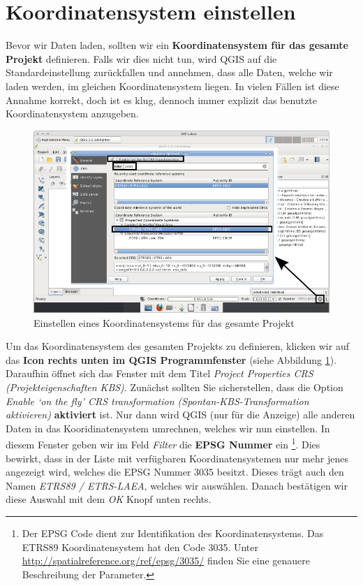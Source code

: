 \documentclass[a4paper,12pt,ngerman]{sphinxmanual}
\begin{document}
\section{Koordinatensystem einstellen}
\label{uebung2:koordinatensystem-einstellen}
Bevor wir Daten laden, sollten wir ein \textbf{Koordinatensystem für das gesamte Projekt} definieren. Falls wir dies nicht tun, wird QGIS auf die Standardeinstellung zurückfallen und annehmen, dass alle Daten, welche wir laden werden, im gleichen Koordinatensystem liegen. In vielen Fällen ist diese Annahme korrekt, doch ist es klug, dennoch immer explizit das benutzte Koordinatensystem anzugeben.
\begin{figure}[htbp]
\centering
\capstart

\includegraphics{qgis_srs.png}
\caption{Einstellen eines Koordinatensystems für das gesamte Projekt}\label{uebung2:figsrs}\end{figure}

Um das Koordinatensystem des gesamten Projekts zu definieren, klicken wir auf das \textbf{Icon rechts unten im QGIS Programmfenster} (siehe Abbildung \hyperref[uebung2:figsrs]{ \ref*{uebung2:figsrs}}). Daraufhin öffnet sich das Fenster mit dem Titel \emph{Project Properties \textbar{} CRS (Projekteigenschaften \textbar{} KBS)}.
Zunächst sollten Sie sicherstellen, dass die Option \emph{Enable `on the fly' CRS transformation (Spontan-KBS-Transformation aktivieren)} \textbf{aktiviert} ist. Nur dann wird QGIS (nur für die Anzeige) alle anderen Daten in das Kooridinatensystem umrechnen, welches wir nun einstellen.
In diesem Fenster geben wir im Feld \emph{Filter} die \textbf{EPSG Nummer}  ein \footnote{
Der EPSG Code dient zur Identifikation des Koordinatensystems. Das ETRS89 Koordinatensystem hat den Code 3035. Unter \href{http://spatialreference.org/ref/epsg/3035/}{http://spatialreference.org/ref/epsg/3035/} finden Sie eine genauere Beschreibung der Parameter.
}. Dies bewirkt, dass in der Liste mit verfügbaren Koordinatensystemen nur mehr jenes angezeigt wird, welches die EPSG Nummer 3035 besitzt.
Dieses trägt auch den Namen \emph{ETRS89 / ETRS-LAEA}, welches wir auswählen. Danach bestätigen wir diese Auswahl mit dem \emph{OK} Knopf unten rechts.
\end{document}
